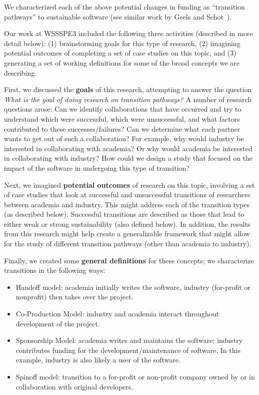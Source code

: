 We characterized each of the above potential changes in funding as ``transition
pathways'' to sustainable software (see similar work by Geels and
Schot~\cite{Geels:2007}).

Our work at WSSSPE3 included the following three activities (described in more detail
below): (1) brainstorming goals for this type of research, (2) imagining
potential outcomes of completing a set of case studies on this topic, and (3)
generating a set of working definitions for some of the broad concepts we are
describing.

First, we discussed the \textbf{goals} of this research, attempting to answer the 
question \emph{What is the goal of doing research on transition pathways?}
A number of research questions arose:  Can we identify collaborations that have 
occurred and try to understand which were successful, which were unsuccessful, 
and what factors contributed to these successes/failures? Can we determine what 
each partner wants to get out of such a collaboration? For example, why would 
industry be interested in collaborating with academia? Or why would academia 
be interested in collaborating with industry? How could we design a study that 
focused on the impact of the software in undergoing this type of transition?

Next, we imagined \textbf{potential outcomes} of research on this topic, involving 
a set of case studies that look at successful and unsuccessful
transitions of researchers between academia and industry. This might address 
each of the transition types (as described below). Successful transitions are
described as those that lead to either weak or strong sustainability (also
defined below). In addition, the results from this research might help create a 
generalizable framework that might allow for the study of different transition 
pathways (other than academia to industry).

Finally, we created some \textbf{general definitions} for these concepts; we 
characterize transitions in the following ways:
\begin{itemize}

\item Handoff model: academia initially writes the software, industry (for-profit 
or nonprofit) then takes over the project.

\item Co-Production Model: industry and academia interact throughout development
of the project.

\item Sponsorship Model: academia writes and maintains the software; 
industry contributes funding for the development\slash maintenance of software.
In this example, industry is also likely a user of the software.

\item Spinoff model: transition to a for-profit or non-profit company owned by or in
collaboration with original developers.

\end{itemize}

